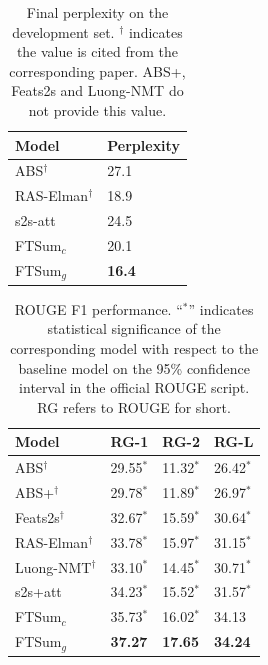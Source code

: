 \documentclass[letterpaper]{article} %
\begin{document}
	\begin{table}
		\centering
		\begin{tabular}{l|l}
			\hline
			Model     & Perplexity \\ \hline
			ABS$^\dag$       & 27.1       \\
			RAS-Elman$^\dag$ & 18.9       \\
			s2s-att   & 24.5       \\
			FTSum$_c$     & 20.1       \\
			FTSum$_g$     & \textbf{16.4}       \\ \hline
		\end{tabular}
		\caption{Final perplexity on the development set. $^\dag$ indicates the value is cited from the corresponding paper. ABS+, Feats2s and Luong-NMT do not provide this value.}
		\label{tb:ppl}
	\end{table}
	
	\begin{table}
		\centering
		\begin{tabular}{l|lll}
			\hline
			Model     & RG-1 & RG-2 & RG-L \\ \hline
			ABS$^\dag$       & 29.55$^*$  & 11.32$^*$  & 26.42$^*$  \\
			ABS+$^\dag$      & 29.78$^*$  & 11.89$^*$  & 26.97$^*$  \\
			Feats2s$^\dag$   & 32.67$^*$  & 15.59$^*$   & 30.64$^*$  \\
			RAS-Elman$^\dag$ & 33.78$^*$  & 15.97$^*$   & 31.15$^*$  \\
			Luong-NMT$^\dag$ & 33.10$^*$  & 14.45$^*$  & 30.71$^*$  \\
			s2s+att   & 34.23$^*$  & 15.52$^*$  & 31.57$^*$  \\ \hline
			FTSum$_c$     & 35.73$^*$   & 16.02$^*$   & 34.13   \\
			FTSum$_g$     & \textbf{37.27}   & \textbf{17.65}   & \textbf{34.24}   \\ \hline
		\end{tabular}
		\caption{ROUGE F1 performance. ``$^*$'' indicates statistical significance of the corresponding model with respect to the baseline model on the 95\% confidence interval in the official ROUGE script. RG refers to ROUGE for short.}
		\label{tb:rouge}
	\end{table}
	
\end{document}
